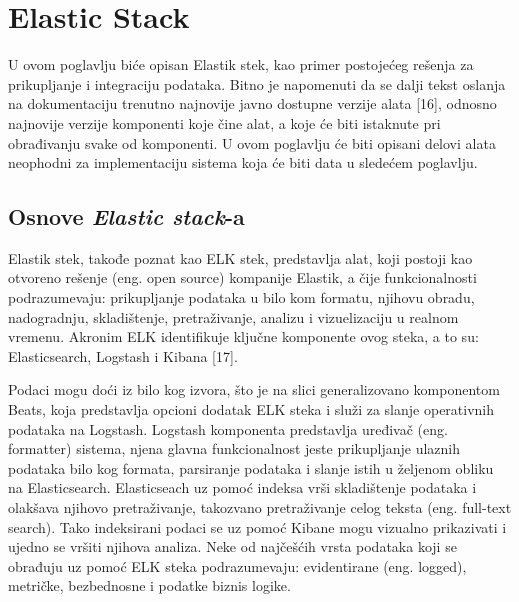 \chapter{Elastic Stack}
U ovom poglavlju biće opisan Elastik stek, kao primer postojećeg rešenja za prikupljanje i integraciju podataka. Bitno je napomenuti da se dalji tekst oslanja na dokumentaciju trenutno najnovije javno dostupne verzije alata [16], odnosno najnovije verzije komponenti koje čine alat, a koje će biti istaknute pri obrađivanju svake od komponenti. U ovom poglavlju će biti opisani delovi alata neophodni za implementaciju sistema koja će biti data u sledećem poglavlju.

\section{Osnove \textit{Elastic stack}-a}
Elastik stek, takođe poznat kao ELK stek, predstavlja alat, koji postoji kao otvoreno rešenje (eng. open source) kompanije Elastik, a čije funkcionalnosti podrazumevaju: prikupljanje podataka u bilo kom formatu, njihovu obradu, nadogradnju, skladištenje, pretraživanje, analizu i vizuelizaciju u realnom vremenu. Akronim ELK identifikuje ključne komponente ovog steka, a to su: Elasticsearch, Logstash i Kibana [17].

\par
Podaci mogu doći iz bilo kog izvora, što je na slici generalizovano komponentom Beats, koja predstavlja opcioni dodatak ELK steka i služi za slanje operativnih podataka na Logstash. Logstash komponenta predstavlja uređivač (eng. formatter) sistema, njena glavna funkcionalnost jeste prikupljanje ulaznih podataka bilo kog formata, parsiranje podataka i slanje istih u željenom obliku na Elasticsearch. Elasticseach uz pomoć indeksa vrši skladištenje podataka i olakšava njihovo pretraživanje, takozvano pretraživanje celog teksta (eng. full-text search). Tako indeksirani podaci se uz pomoć Kibane mogu vizualno prikazivati i ujedno se vršiti njihova analiza.
Neke od najčešćih vrsta podataka koji se obrađuju uz pomoć ELK steka podrazumevaju: evidentirane (eng. logged), metričke, bezbednosne i podatke biznis logike.




